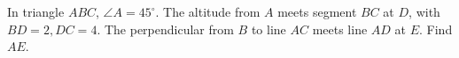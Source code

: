 In triangle $ABC$, $\angle A=45^\circ$. The altitude from $A$ meets segment $BC$ at $D$, with $BD=2,DC=4$. The perpendicular from $B$ to line $AC$ meets line $AD$ at $E$. Find $AE$.
